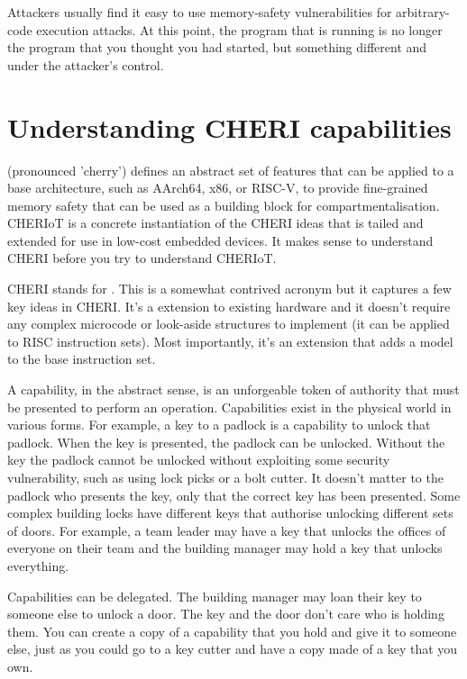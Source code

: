 Attackers usually find it easy to use memory-safety vulnerabilities for arbitrary-code execution attacks.
At this point, the program that is running is no longer the program that you thought you had started, but something different and under the attacker's control.

\section{Understanding CHERI capabilities}

 (pronounced 'cherry') defines an abstract set of features that can be applied to a base architecture, such as AArch64, x86, or RISC-V, to provide fine-grained memory safety that can be used as a building block for compartmentalisation.
CHERIoT is a concrete instantiation of the CHERI ideas that is tailed and extended for use in low-cost embedded devices.
It makes sense to understand CHERI before you try to understand CHERIoT.

CHERI stands for .
This is a somewhat contrived acronym but it captures a few key ideas in CHERI.
It's a extension to existing hardware and it doesn't require any complex microcode or look-aside structures to implement (it can be applied to RISC instruction sets).
Most importantly, it's an extension that adds a  model to the base instruction set.

A capability, in the abstract sense, is an unforgeable token of authority that must be presented to perform an operation.
Capabilities exist in the physical world in various forms.
For example, a key to a padlock is a capability to unlock that padlock.
When the key is presented, the padlock can be unlocked. 
Without the key the padlock cannot be unlocked without exploiting some security vulnerability, such as using lock picks or a bolt cutter.
It doesn't matter to the padlock who presents the key, only that the correct key has been presented.
Some complex building locks have different keys that authorise unlocking different sets of doors.
For example, a team leader may have a key that unlocks the offices of everyone on their team and the building manager may hold a key that unlocks everything.

Capabilities can be delegated.
The building manager may loan their key to someone else to unlock a door.
The key and the door don't care who is holding them.
You can create a copy of a capability that you hold and give it to someone else, just as you could go to a key cutter and have a copy made of a key that you own.

